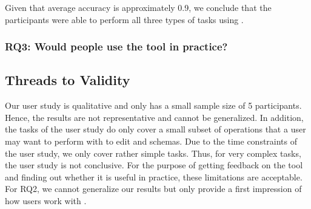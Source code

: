 Given that average accuracy is approximately 0.9, we conclude that the participants were able to perform all three types of tasks using \toolname{}.

\subsubsection{\textbf{RQ3:} Would people use the tool in practice?} %








\subsection{Threads to Validity}\label{subsec:threads_to_validity} %

Our user study is qualitative and only has a small sample size of 5 participants.
Hence, the results are not representative and cannot be generalized.
In addition, the tasks of the user study do only cover a small subset of operations
that a user may want to perform with \toolname{} to edit \cfgfiles{} and schemas.
Due to the time constraints of the user study, we only cover rather simple tasks.
Thus, for very complex tasks, the user study is not conclusive.
For the purpose of getting feedback on the tool and finding out whether it is useful in practice, these limitations are acceptable.
For RQ2, we cannot generalize our results but only provide a first impression of how users work with \toolname{}.



